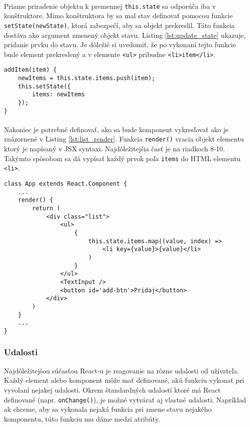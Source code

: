\paragraph{}
Priame priradenie objektu k premennej \texttt{this.state} sa odporúča iba v konštruktore. Mimo konštruktora by sa mal stav definovať pomocou funkcie \texttt{setState(newState)}, ktorá zabezpečí, aby sa objekt prekreslil. Táto funkcia dostáva ako argument zmenený objekt stavu. Listing \ref{lst:update_state} ukazuje, pridanie prvku do stavu. Je dôležié si uvedomiť, že po vykonaní tejto funkcie bude element prekreslený a v elemente \texttt{<ul>} pribudne \texttt{<li>item</li>}.
\begin{lstlisting}[caption={Zmena stavu komponentu pomocou funkcie \texttt{setState()}}, label={lst:update_state}]
addItem(item) {
	newItems = this.state.items.push(item);
	this.setState({
		items: newItems
	});
}
\end{lstlisting}
\paragraph{}
Nakoniec je potrebné definovať, ako sa bude komponent vykresľovať ako je znázornené v Listing \ref{lst:list_render}. Funkcia \texttt{render()} vracia objekt elementu ktorý je napísaný v JSX syntaxi. Najdôležitejšia časť je na riadkoch 8-10. Takýmto spôsobom sa dá vypísať každý prvok poľa \texttt{items} do HTML elementu \texttt{<li>}.
\begin{lstlisting}[caption={Vykresľovanie komponentu \texttt{App}},label={lst:list_render}]
class App extends React.Component {
	...
	render() {
		return (
			<div class="list">
				<ul>
					{
						this.state.items.map((value, index) => 
							<li key={value}>{value}</li>					
						)				
					}
				</ul>
				<TextInput />
				<button id='add-btn'>Pridaj</button>
			</div>	
		)
	}
	...
} 
\end{lstlisting}





\subsubsection{Udalosti}
Najdôležitejšou súčasťou React-u je reagovanie na rôzne udalosti od užívateľa. Každý element alebo komponent môže mať definované, akú funkciu vykonať pri vyvolaní nejakej udalosti. Okrem štandardných udalostí ktoré má React definované (napr. \texttt{onChange()}), je možné vytvárať aj vlastné udalosti. Napríklad ak chceme, aby sa vykonala nejaká funkcia pri zmene stavu nejakého komponentu, túto funkciu mu dáme medzi atribúty.
